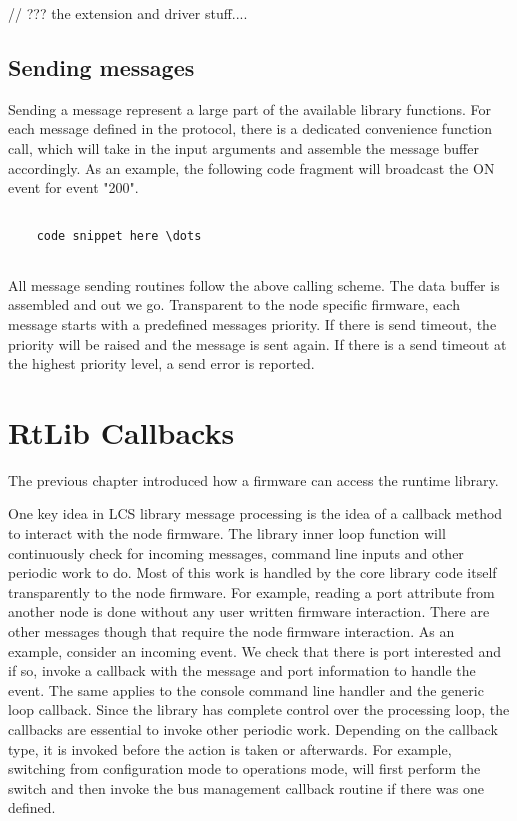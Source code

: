// ??? the extension and driver stuff....


\subsection{Sending messages}

Sending a message represent a large part of the available library functions. For each message defined in the protocol, there is a dedicated convenience function call, which will take in the input arguments and assemble the message buffer accordingly. As an example, the following code fragment will broadcast the ON event for event "200".

\lstset{language=c++, style=codesnippetstyle}
\begin{lstlisting}
   
    code snippet here \dots
    
\end{lstlisting}

All message sending routines follow the above calling scheme. The data buffer is assembled and out we go. Transparent to the node specific firmware, each message starts with a predefined messages priority. If there is send timeout, the priority will be raised and the message is sent again. If there is a send timeout at the highest priority level, a send error is reported.


\section{RtLib Callbacks}

The previous chapter introduced how a firmware can access the runtime library. 


One key idea in LCS library message processing is the idea of a callback method to interact with the node firmware. The library inner loop function will continuously check for incoming messages, command line inputs and other periodic work to do. Most of this work is handled by the core library code itself transparently to the node firmware. For example, reading a port attribute from another node is done without any user written firmware interaction. There are other messages though that require the node firmware interaction. As an example, consider an incoming event. We check that there is port interested and if so, invoke a callback with the message and port information to handle the event. The same applies to the console command line handler and the generic loop callback. Since the library has complete control over the processing loop, the callbacks are essential to invoke other periodic work. Depending on the callback type, it is invoked before the action is taken or afterwards. For example, switching from configuration mode to operations mode, will first perform the switch and then invoke the bus management callback routine if there was one defined.

